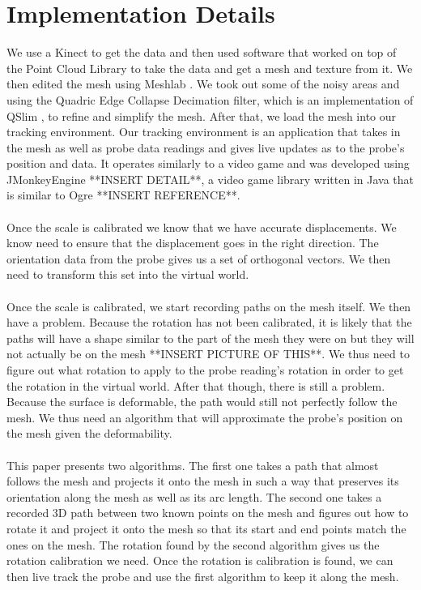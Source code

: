 \documentclass[conference]{acmsiggraph}
\begin{document}
\section{Implementation Details}

We use a Kinect to get the data and then used software that worked on top of the Point Cloud Library \cite{pointcloudlibrary} to take the data and get a mesh and texture from it. We then edited the mesh using Meshlab \cite{meshlab}. We took out some of the noisy areas and using the Quadric Edge Collapse Decimation filter, which is an implementation of QSlim \cite{qslim}, to refine and simplify the mesh. After that, we load the mesh into our tracking environment. Our tracking environment is an application that takes in the mesh as well as probe data readings and gives live updates as to the probe's position and data. It operates similarly to a video game and was developed using JMonkeyEngine **INSERT DETAIL**, a video game library written in Java that is similar to Ogre **INSERT REFERENCE**. \\
\\
Once the scale is calibrated we know that we have accurate displacements. We know need to ensure that the displacement goes in the right direction. The orientation data from the probe gives us a set of orthogonal vectors. We then need to transform this set into the virtual world.\\
\\
Once the scale is calibrated, we start recording paths on the mesh itself. We then have a problem. Because the rotation has not been calibrated, it is likely that the paths will have a shape similar to the part of the mesh they were on but they will not actually be on the mesh **INSERT PICTURE OF THIS**. We thus need to figure out what rotation to apply to the probe reading's rotation in order to get the rotation in the virtual world. After that though, there is still a problem. Because the surface is deformable, the path would still not perfectly follow the mesh. We thus need an algorithm that will approximate the probe's position on the mesh given the deformability. \\
\\
This paper presents two algorithms. The first one takes a path that almost follows the mesh and projects it onto the mesh in such a way that preserves its orientation along the mesh as well as its arc length. The second one takes a recorded 3D path between two known points on the mesh and figures out how to rotate it and project it onto the mesh so that its start and end points match the ones on the mesh. The rotation found by the second algorithm gives us the rotation calibration we need. Once the rotation is calibration is found, we can then live track the probe and use the first algorithm to keep it along the mesh. 
\end{document}
